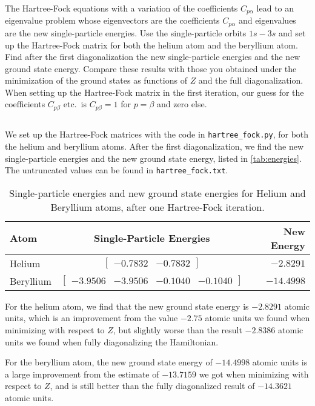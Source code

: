 The Hartree-Fock equations with a variation of the coefficients $C_{p\alpha}$ lead to an eigenvalue problem whose eigenvectors are the coefficients $C_{p\alpha}$ and eigenvalues are the new single-particle energies.
Use the single-particle orbits $1s{-}3s$ and set up the Hartree-Fock matrix for both the helium atom and the beryllium atom.
Find after the first diagonalization the new single-particle energies and the new ground state energy.
Compare these results with those you obtained under the minimization of the ground states as functions of $Z$ and the full diagonalization.
When setting up the Hartree-Fock matrix in the first iteration, our guess for the coefficients $C_{p\beta}$ etc.\ is $C_{p\beta}=1$ for $p=\beta$ and zero else.

\subsection{}
We set up the Hartree-Fock matrices with the code in \verb|hartree_fock.py|, for both the helium and beryllium atoms.
After the first diagonalization, we find the new single-particle energies and the new ground state energy, listed in \autoref{tab:energies}.
The untruncated values can be found in \verb|hartree_fock.txt|.

\begin{table}[h!]
    \caption{Single-particle energies and new ground state energies for Helium and Beryllium atoms, after one Hartree-Fock iteration.\label{tab:energies}}
    \centering
    \small
    \begin{tabular}{lcr}
        \toprule\toprule
        Atom & Single-Particle Energies & New Energy \\ \midrule
        Helium & $
        \begin{bmatrix}
            -0.7832 & -0.7832
        \end{bmatrix}
        $ & $-2.8291$ \\ \midrule
        Beryllium & $
        \begin{bmatrix}
            -3.9506 & -3.9506 & -0.1040 & -0.1040
        \end{bmatrix}
        $ & $-14.4998$ \\ \bottomrule
    \end{tabular}
\end{table}

For the helium atom, we find that the new ground state energy is $-2.8291$ atomic units, which is an improvement from the value $-2.75$ atomic units we found when minimizing with respect to $Z$, but slightly worse than the result $-2.8386$ atomic units we found when fully diagonalizing the Hamiltonian.

For the beryllium atom, the new ground state energy of $-14.4998$ atomic units is a large improvement from the estimate of $-13.7159$ we got when minimizing with respect to $Z$, and is still better than the fully diagonalized result of $-14.3621$ atomic units.
